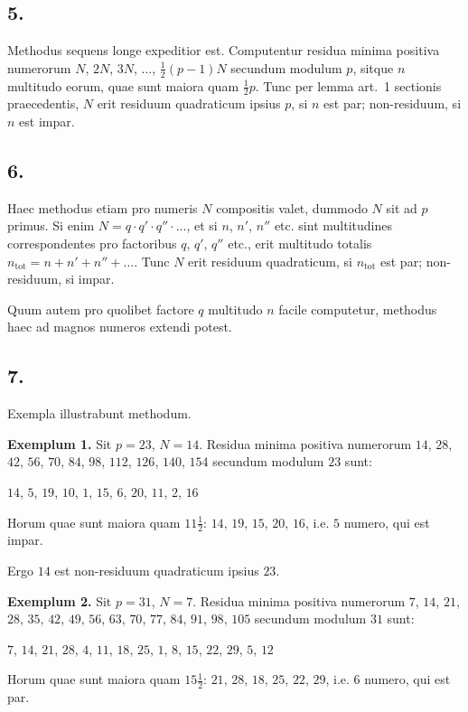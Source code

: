 \documentclass[12pt,a4paper]{article}
\theoremstyle{plain}
\theoremstyle{definition}
\theoremstyle{remark}
\begin{document}
\subsection*{5.}
Methodus sequens longe expeditior est. Computentur residua minima positiva numerorum $N$, $2N$, $3N$, $\ldots$, $\frac{1}{2}(p-1)N$ secundum modulum $p$, sitque $n$ multitudo eorum, quae sunt maiora quam $\frac{1}{2}p$. Tunc per lemma art.~1 sectionis praecedentis, $N$ erit residuum quadraticum ipsius $p$, si $n$ est par; non-residuum, si $n$ est impar.

\subsection*{6.}
Haec methodus etiam pro numeris $N$ compositis valet, dummodo $N$ sit ad $p$ primus. Si enim $N=q \cdot q' \cdot q'' \cdot \ldots$, et si $n$, $n'$, $n''$ etc. sint multitudines correspondentes pro factoribus $q$, $q'$, $q''$ etc., erit multitudo totalis $n_{\text{tot}} = n + n' + n'' + \ldots$. Tunc $N$ erit residuum quadraticum, si $n_{\text{tot}}$ est par; non-residuum, si impar.

Quum autem pro quolibet factore $q$ multitudo $n$ facile computetur, methodus haec ad magnos numeros extendi potest.

\newpage
\subsection*{7.}
Exempla illustrabunt methodum.

\textbf{Exemplum 1.} Sit $p=23$, $N=14$. Residua minima positiva numerorum $14$, $28$, $42$, $56$, $70$, $84$, $98$, $112$, $126$, $140$, $154$ secundum modulum $23$ sunt:

$14$, $5$, $19$, $10$, $1$, $15$, $6$, $20$, $11$, $2$, $16$

Horum quae sunt maiora quam $11\frac{1}{2}$: $14$, $19$, $15$, $20$, $16$, i.e. $5$ numero, qui est impar.

Ergo $14$ est non-residuum quadraticum ipsius $23$.

\textbf{Exemplum 2.} Sit $p=31$, $N=7$. Residua minima positiva numerorum $7$, $14$, $21$, $28$, $35$, $42$, $49$, $56$, $63$, $70$, $77$, $84$, $91$, $98$, $105$ secundum modulum $31$ sunt:

$7$, $14$, $21$, $28$, $4$, $11$, $18$, $25$, $1$, $8$, $15$, $22$, $29$, $5$, $12$

Horum quae sunt maiora quam $15\frac{1}{2}$: $21$, $28$, $18$, $25$, $22$, $29$, i.e. $6$ numero, qui est par.
\end{document}

